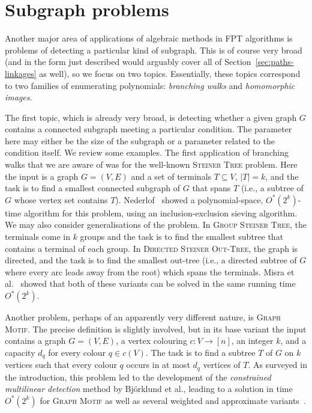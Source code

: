 \documentclass[10pt,a4paper]{article}
\begin{document}
\section{Subgraph problems}
\label{sec:subgraphs}

Another major area of applications of algebraic methods in FPT
algorithms is problems of detecting a particular kind of subgraph. 
This is of course very broad (and in the form just described would
arguably cover all of Section~\ref{sec:paths-linkages} as well),
so we focus on two topics. Essentially, these topics correspond to two
families of enumerating polynomials: \emph{branching walks} and
\emph{homomorphic images}. 

The first topic, which is already very broad, is detecting whether a
given graph $G$ contains a connected subgraph meeting a particular
condition. The parameter here may either be the size of the subgraph
or a parameter related to the condition itself. We review some
examples. The first application of branching walks that we are aware
of was for the well-known \textsc{Steiner Tree} problem.
Here the input is a graph $G=(V,E)$ and a set of terminals $T \subseteq V$, $|T|=k$,
and the task is to find a smallest connected subgraph of $G$ that
spans $T$ (i.e., a subtree of $G$ whose vertex set contains $T$).
Nederlof~\cite{Nederlof13algorithmica} showed a polynomial-space,
$O^*(2^k)$-time algorithm for this problem, using an inclusion-exclusion
sieving algorithm. We may also consider generalisations of the problem.
In \textsc{Group Steiner Tree}, the terminals come in $k$ groups and
the task is to find the smallest subtree that contains a terminal of
each group. In \textsc{Directed Steiner Out-Tree}, the graph is
directed, and the task is to find the smallest out-tree (i.e., a
directed subtree of $G$ where every arc leads away from the root)
which spans the terminals. Misra et al.~\cite{MisraPRSS12} showed that both of these
variants can be solved in the same running time $O^*(2^k)$.

Another problem, perhaps of an apparently very different nature, is
\textsc{Graph Motif}. The precise definition is slightly involved,
but in its base variant the input contains a graph $G=(V,E)$,
a vertex colouring $c \colon V \to [n]$, an integer $k$,
and a capacity $d_q$ for every colour $q \in c(V)$.
The task is to find a subtree $T$ of $G$ on $k$ vertices such that
every colour $q$ occurs in at most $d_q$ vertices of $T$. 
As surveyed in the introduction, this problem led to the development
of the \emph{constrained multilinear detection} method by Björklund et
al., leading to a solution in time $O^*(2^k)$ for \textsc{Graph Motif}
as well as several weighted and approximate variants~\cite{BjorklundKK16}.
\end{document}
